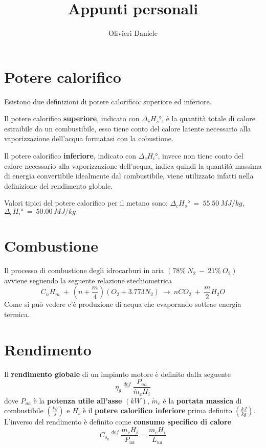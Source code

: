 \documentclass[a4paper,10pt]{article}
\title{Appunti personali}
\author{Olivieri Daniele}
\begin{document}
\maketitle
\section{Potere calorifico}
\label{sec:potere_calorifico}
Esistono due definizioni di potere calorifico: superiore ed inferiore.

Il potere calorifico \textbf{superiore}, indicato con $\Delta_c H_s\text{°}$, è la quantità totale di calore estraibile da un combustibile, esso tiene conto del calore latente necessario alla vaporizzazione dell'acqua formatasi con la cobustione.

Il potere calorifico \textbf{inferiore}, indicato con $\Delta_c H_i\text{°}$, invece non tiene conto del calore necessario alla vaporizzazione dell'acqua, indica quindi la quantità massima di energia convertibile idealmente dal combustibile, viene utilizzato infatti nella definizione del rendimento globale.

Valori tipici del potere calorifico per il metano sono: $\Delta_c H_s\text{°}\ =\ 55.50\ MJ/kg$, $\Delta_c H_i\text{°}\ =\ 50.00\ MJ/kg$

\section{Combustione}
\label{sec:combustione}
Il processo di combustione degli idrocarburi in aria $\left(78\%\ N_2\ -\ 21\%\ O_2 \right)$ avviene seguendo la seguente relazione stechiometrica
\begin{equation}
C_n H_m\ +\ \left(n+\frac{m}{4}\right)\left(O_2+3.773N_2\right)\ \rightarrow\ nCO_2\ +\ \frac{m}{2}H_2O
\end{equation}
Come si può vedere c'è produzione di acqua che evaporando sottrae energia termica.

\section{Rendimento}
\label{sec:rendimento}
Il \textbf{rendimento globale} di un impianto motore è definito dalla seguente
\begin{equation}
 \eta_g \stackrel{def}{=} \frac{P_{ua}}{\dot{m}_c H_i}
\end{equation}
dove $P_{ua}$ è la \textbf{potenza utile all'asse} $\left(kW\right)$, $\dot{m}_c$ è la \textbf{portata massica} di combustibile $\left(\frac{kg}{s}\right)$ e $H_i$ è il \textbf{potere calorifico inferiore} prima definito $\left(\frac{kJ}{kg}\right)$.
L'inverso del rendimento è definito come \textbf{consumo specifico di calore}
\begin{equation}
C_{s_q} \stackrel{def}{=} \frac{\dot{m}_c H_i}{P_{ua}} = \frac{m_c H_i}{L_{ua}}
\end{equation}
\end{document}
